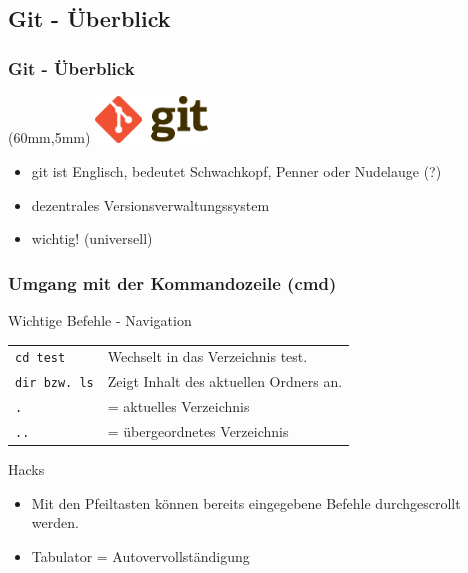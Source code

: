 \documentclass[18pt]{beamer}
\begin{document}
	\subsection{Git - Überblick}
	\begin{frame}
		\frametitle{Git - Überblick}
		\begin{textblock*}{20mm}(60mm,5mm)
			\includegraphics[width=30mm, scale=0.8]{./pics/tut0/Git-logo.png}
		\end{textblock*}
		\begin{itemize}
			\item git ist Englisch, bedeutet Schwachkopf, Penner oder Nudelauge (?)
			\item dezentrales Versionsverwaltungssystem
			\item wichtig! (universell)
		\end{itemize}
	\end{frame}
	
	\begin{frame}
		\frametitle{Umgang mit der Kommandozeile (cmd)}
		\begin{block}{Wichtige Befehle - Navigation}
			\begin{tabular}{ll}
				\texttt{cd test} &  Wechselt in das Verzeichnis test.\\
				\texttt{dir bzw. ls} &  Zeigt Inhalt des aktuellen Ordners an.\\
				\texttt{.} & = aktuelles Verzeichnis\\ 
				\texttt{..} & = übergeordnetes Verzeichnis\\
			\end{tabular}
		\end{block}
		
		\begin{alertblock}{Hacks}
			\begin{itemize}
				\item Mit den Pfeiltasten können bereits eingegebene Befehle durchgescrollt werden.
				\item Tabulator = Autovervollständigung
			\end{itemize}
		\end{alertblock}
		
	\end{frame}
	
\end{document}

